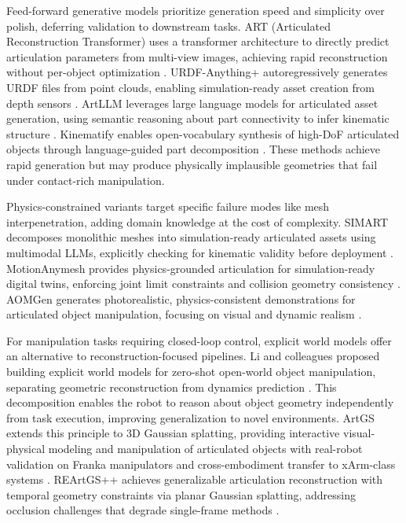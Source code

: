 \documentclass[12pt,a4paper,oneside]{report}
\begin{document}
Feed-forward generative models prioritize generation speed and simplicity over polish, deferring validation to downstream tasks. ART (Articulated Reconstruction Transformer) uses a transformer architecture to directly predict articulation parameters from multi-view images, achieving rapid reconstruction without per-object optimization \cite{li2025art}. URDF-Anything+ autoregressively generates URDF files from point clouds, enabling simulation-ready asset creation from depth sensors \cite{wu2025urdfanything}. ArtLLM leverages large language models for articulated asset generation, using semantic reasoning about part connectivity to infer kinematic structure \cite{wang2025artllm}. Kinematify enables open-vocabulary synthesis of high-DoF articulated objects through language-guided part decomposition \cite{wang2025kinematify}. These methods achieve rapid generation but may produce physically implausible geometries that fail under contact-rich manipulation.

Physics-constrained variants target specific failure modes like mesh interpenetration, adding domain knowledge at the cost of complexity. SIMART decomposes monolithic meshes into simulation-ready articulated assets using multimodal LLMs, explicitly checking for kinematic validity before deployment \cite{zhang2025simart}. MotionAnymesh provides physics-grounded articulation for simulation-ready digital twins, enforcing joint limit constraints and collision geometry consistency \cite{xu2025motionanymesh}. AOMGen generates photorealistic, physics-consistent demonstrations for articulated object manipulation, focusing on visual and dynamic realism \cite{wu2024aomgen}.

For manipulation tasks requiring closed-loop control, explicit world models offer an alternative to reconstruction-focused pipelines. Li and colleagues proposed building explicit world models for zero-shot open-world object manipulation, separating geometric reconstruction from dynamics prediction \cite{li2024explicit}. This decomposition enables the robot to reason about object geometry independently from task execution, improving generalization to novel environments. ArtGS extends this principle to 3D Gaussian splatting, providing interactive visual-physical modeling and manipulation of articulated objects with real-robot validation on Franka manipulators and cross-embodiment transfer to xArm-class systems \cite{yu2025artgs}. REArtGS++ achieves generalizable articulation reconstruction with temporal geometry constraints via planar Gaussian splatting, addressing occlusion challenges that degrade single-frame methods \cite{wu2025reartgs}.
\end{document}
